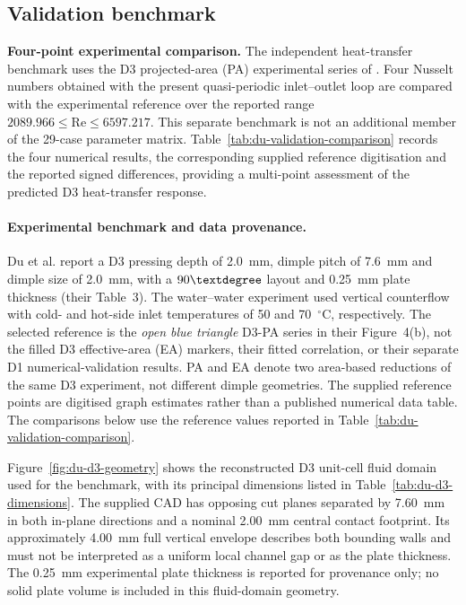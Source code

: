 
\subsection{Validation benchmark}
\label{sec:du-validation}

\noindent\textbf{Four-point experimental comparison.} The independent heat-transfer benchmark uses the D3 projected-area (PA) experimental series of \citet{du2025}. Four Nusselt numbers obtained with the present quasi-periodic inlet--outlet loop are compared with the experimental reference over the reported range $2089.966\leq\mathrm{Re}\leq6597.217$. This separate benchmark is not an additional member of the 29-case parameter matrix. Table~\ref{tab:du-validation-comparison} records the four numerical results, the corresponding supplied reference digitisation and the reported signed differences, providing a multi-point assessment of the predicted D3 heat-transfer response.

\paragraph{Experimental benchmark and data provenance.}
Du et al. report a D3 pressing depth of 2.0~mm, dimple pitch of 7.6~mm and dimple size of 2.0~mm, with a $90\degree$ layout and 0.25~mm plate thickness (their Table~3). The water--water experiment used vertical counterflow with cold- and hot-side inlet temperatures of 50 and 70~$^\circ$C, respectively. The selected reference is the \emph{open blue triangle} D3-PA series in their Figure~4(b), not the filled D3 effective-area (EA) markers, their fitted correlation, or their separate D1 numerical-validation results. PA and EA denote two area-based reductions of the same D3 experiment, not different dimple geometries. The supplied reference points are digitised graph estimates rather than a published numerical data table. The comparisons below use the reference values reported in Table~\ref{tab:du-validation-comparison}.

Figure~\ref{fig:du-d3-geometry} shows the reconstructed D3 unit-cell fluid domain used for the benchmark, with its principal dimensions listed in Table~\ref{tab:du-d3-dimensions}. The supplied CAD has opposing cut planes separated by 7.60~mm in both in-plane directions and a nominal 2.00~mm central contact footprint. Its approximately 4.00~mm full vertical envelope describes both bounding walls and must not be interpreted as a uniform local channel gap or as the plate thickness. The 0.25~mm experimental plate thickness is reported for provenance only; no solid plate volume is included in this fluid-domain geometry.

